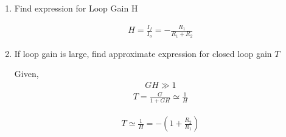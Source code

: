 \begin{enumerate}[label=\thesubsection.\arabic*.,ref=\thesubsection.\theenumi]
\solution
\begin{align}
    R_{i}=R_{s}\|R_{i d}\|(R_{1}+R_{2})
\end{align}
\begin{align}
    V_{i}=I_{i} R_{i}
\end{align}
\begin{align}
    I_{o}=-\mu V_{i} \frac{1}{1 / g_{m}+(R_{1}\|R_{2}\| r_{o 2})} \frac{r_{o 2}}{r_{o 2}+(R_{1} \| R_{2})}
\end{align}
\begin{align}
    G = \frac{I_{o}}{I_{i}}=-\mu \frac{R_{i}}{1 / g_{m}+(R_{1}\|R_{2}\| r_{o 2})} \frac{r_{o 2}}{r_{o 2}+(R_{1} \| R_{2})}
\end{align}
We use the approximation
\begin{align}
    1 / g_{m} \ll (R_{1}\|R_{2}\| r_{o 2})
\end{align}
This is because the $\frac{1}{g_{m}}$ is in order of few \ohm s but, $R_{1}$, $R_{2}$ and $r_{o2}$ are in order of k\ohm s 

\begin{align}
    G =-\mu \frac{R_{i}}{R_{1} \| R_{2}}
\end{align}
\begin{align}
    R_{o}=r_{o 2}+(R_{1} \| R_{2})+(g_{m} r_{o 2})(R_{1} \| R_{2})
\end{align}
\begin{align}
    \implies R_{o} \simeq g_{m} r_{o 2}\left(R_{1} \| R_{2}\right)
\end{align}

\item
Find expression for Loop Gain H

\solution
\begin{align}
    H = \frac{I_{f}}{I_{o}}=-\frac{R_{1}}{R_{1}+R_{2}}
\end{align}

\item
If loop gain is large, find approximate expression for closed loop gain $T$

\solution
Given,
\begin{align}
    GH \gg 1
\end{align}
\begin{align}
    T = \frac{G}{1+GH}\simeq \frac{1}{H}
\end{align}


\begin{align}
    T \simeq \frac{1}{H}=-\left(1+\frac{R_{2}}{R_{1}}\right)
\end{align}


\end{enumerate}
